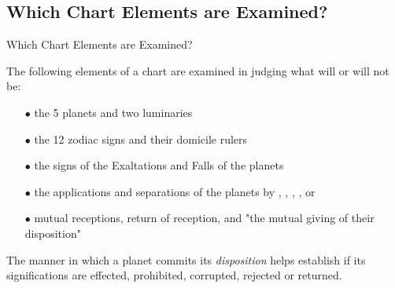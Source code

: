 \subsection{Which Chart Elements are Examined?}
\begin{frame}[t]{Which Chart Elements are Examined?}

The following elements of a chart are examined in judging what will or will not be:
\begin{itemize}
\item[$\bullet$] the 5 planets and two luminaries
\item[$\bullet$] the 12 zodiac signs and their domicile rulers
\item[$\bullet$] the signs of  the Exaltations and Falls of the planets
\item[$\bullet$] the applications and separations of the planets by \Conjunction, \Sextile, \Square, \Trine, or \Opposition\ 
\item[$\bullet$] mutual receptions, return of reception, and "the mutual giving of their disposition"
\end{itemize}
\vspace{0.5cm}

The manner in which a planet commits its \textsl{disposition} helps establish if its significations are effected, prohibited, corrupted, rejected or returned.
\end{frame}
